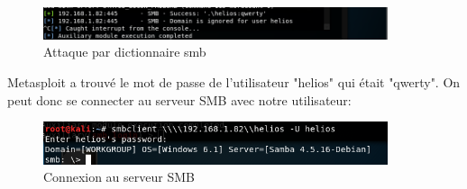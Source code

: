 \begin{figure}[]
  \centering
  \setlength\figureheight{7cm}
  \setlength\figurewidth{9cm}
  \includegraphics[width=0.9\textwidth]{oui/Ancien/imangeancien/msf_smb_pass2.PNG}
  \caption{Attaque par dictionnaire smb}
  \label{fig:smb-dic-2}
\end{figure}

Metasploit a trouvé le mot de passe de l'utilisateur "helios" qui était "qwerty". On peut donc se connecter au serveur SMB avec notre utilisateur:

\begin{figure}[h]
  \centering
  \setlength\figureheight{7cm}
  \setlength\figurewidth{9cm}
  \includegraphics[width=0.9\textwidth]{oui/Ancien/imangeancien/msf_smb_pass3.PNG}
  \caption{Connexion au serveur SMB}
  \label{fig:courbe-tikz}
\end{figure}